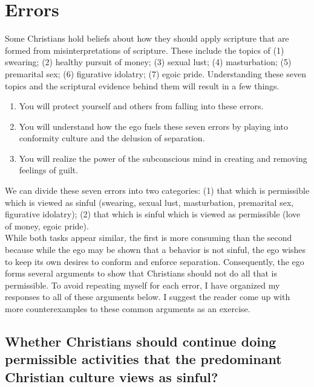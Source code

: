 \documentclass[a4paper, 12pt]{article}
\begin{document}
\section{Errors}
Some Christians hold beliefs about how they should apply scripture that are formed from misinterpretations of scripture. These include the topics of (1) swearing; (2) healthy pursuit of money; (3) sexual lust; (4) masturbation; (5) premarital sex; (6) figurative idolatry; (7) egoic pride. Understanding these seven topics and the scriptural evidence behind them will result in a few things.
\begin{enumerate}
  \item You will protect yourself and others from falling into these errors.
  \item You will understand how the ego fuels these seven errors by playing into conformity culture and the delusion of separation.
  \item You will realize the power of the subconscious mind in creating and removing feelings of guilt.
\end{enumerate}
We can divide these seven errors into two categories: (1) that which is permissible which is viewed as sinful (swearing, sexual lust, masturbation, premarital sex, figurative idolatry); (2) that which is sinful which is viewed as permissible (love of money, egoic pride). \\
\break
While both tasks appear similar, the first is more consuming than the second because while the ego may be shown that a behavior is not sinful, the ego wishes to keep its own desires to conform and enforce separation. Consequently, the ego forms several arguments to show that Christians should not do all that is permissible. To avoid repeating myself for each error, I have organized my responses to all of these arguments below. I suggest the reader come up with more counterexamples to these common arguments as an exercise. \\
\pagebreak
\subsection{Whether Christians should continue doing permissible activities that the predominant Christian culture views as sinful?}
\end{document}
